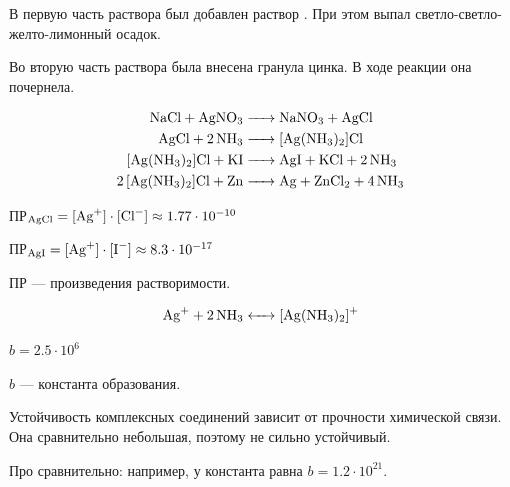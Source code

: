 \documentclass[a4paper, 12pt]{article}
\begin{document}
В первую часть раствора был добавлен раствор . При этом выпал светло-светло-желто-лимонный осадок.

Во вторую часть раствора была внесена гранула цинка. В ходе реакции она почернела.

\begin{align}
	\ce{NaCl + AgNO3 &-> NaNO3 + AgCl}\\
	\ce{AgCl + 2NH3 &-> [Ag(NH3)2]Cl}\\
	\ce{[Ag(NH3)2]Cl + KI &-> AgI + KCl + 2NH3} \\
	\ce{2[Ag(NH3)2]Cl + Zn &-> Ag + ZnCl2 + 4NH3} %
\end{align}

ПР$_{\ce{AgCl}} = [\ce{Ag^+}]\cdot[\ce{Cl^-}] \approx 1.77 \cdot 10^{-10}$

ПР$_{\ce{AgI}} = [\ce{Ag^+}]\cdot[\ce{I^-}] \approx 8.3 \cdot 10^{-17}$

ПР --- произведения растворимости. 

\begin{equation}
	\ce{Ag+ + 2NH3 <-> [Ag(NH3)2]+}
\end{equation}

$b = 2.5 \cdot 10^6$

$b$ --- константа образования.

Устойчивость комплексных соединений зависит от прочности химической связи. Она сравнительно небольшая, поэтому \ce{[Ag(NH3)2]+} не сильно устойчивый. 

Про сравнительно: например, у \ce{ [Ag(CN)2]-} константа равна $b = 1.2 \cdot 10^{21}$. 
\end{document}
